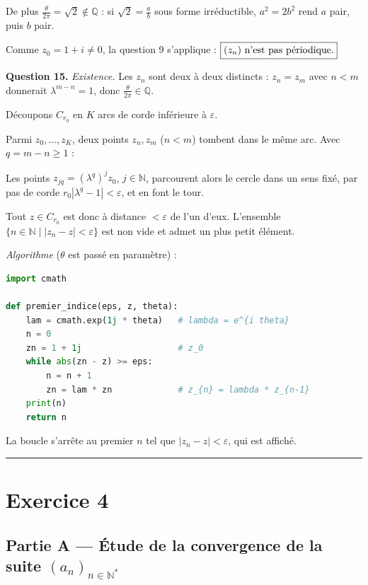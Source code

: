 \documentclass[11pt,a4paper]{article}
\newcommand{\equationajustee}[1]{%
  \sbox{\boiteequation}{$\displaystyle #1$}%
  \ifdim\wd\boiteequation>\linewidth
    \[\resizebox{\linewidth}{!}{\usebox{\boiteequation}}\]%
  \else
    \[#1\]%
  \fi}
\begin{document}
De plus \(\frac\theta{2\pi}=\sqrt2\notin\mathbb{Q}\) : si \(\sqrt2=\frac ab\) sous forme irréductible, \(a^2=2b^2\) rend \(a\) pair, puis \(b\) pair.

Comme \(z_0=1+i\neq0\), la question 9 s'applique : \(\boxed{(z_n) \text{ n'est pas \text{périodique}.}}\)

\textbf{Question 15.} \emph{Existence.} Les \(z_n\) sont deux à deux distincts : \(z_n=z_m\) avec \(n<m\) donnerait \(\lambda^{m-n}=1\), donc \(\frac\theta{2\pi}\in\mathbb{Q}\).

Découpons \(C_{r_0}\) en \(K\) arcs de corde inférieure à \(\varepsilon\).

Parmi \(z_0,\dots,z_K\), deux points \(z_n,z_m\) (\(n<m\)) tombent dans le même arc. Avec \(q=m-n\ge1\) :

\equationajustee{0<r_0|\lambda^q-1|=|z_m-z_n|<\varepsilon.}

Les points \(z_{jq}=(\lambda^q)^jz_0\), \(j\in\mathbb{N}\), parcourent alors le cercle dans un sens fixé, par pas de corde \(r_0|\lambda^q-1|<\varepsilon\), et en font le tour.

Tout \(z\in C_{r_0}\) est donc à distance \(<\varepsilon\) de l'un d'eux. L'ensemble \(\{n\in\mathbb{N}\mid|z_n-z|<\varepsilon\}\) est non vide et admet un plus petit élément.

\emph{Algorithme} (\(\theta\) est passé en paramètre) :

\begin{lstlisting}[language=Python]
import cmath

def premier_indice(eps, z, theta):
    lam = cmath.exp(1j * theta)   # lambda = e^{i theta}
    n = 0
    zn = 1 + 1j                   # z_0
    while abs(zn - z) >= eps:
        n = n + 1
        zn = lam * zn             # z_{n} = lambda * z_{n-1}
    print(n)
    return n
\end{lstlisting}

La boucle s'arrête au premier \(n\) tel que \(|z_n-z|<\varepsilon\), qui est affiché.

\begin{center}\rule{0.5\linewidth}{0.5pt}\end{center}

\hypertarget{exercice-4}{%
\section{Exercice 4}\label{exercice-4}}

\hypertarget{partie-a-uxe9tude-de-la-convergence-de-la-suite-a_n_ninmathbbn}{%
\subsection{\texorpdfstring{Partie A --- Étude de la convergence de la suite \((a_n)_{n\in{\mathbb{N}}^*}\)}{Partie A --- Étude de la convergence de la suite (a\_n)\_\{n\textbackslash in\{\textbackslash mathbb\{N\}\}\^{}*\}}}\label{partie-a-uxe9tude-de-la-convergence-de-la-suite-a_n_ninmathbbn}}
\end{document}
